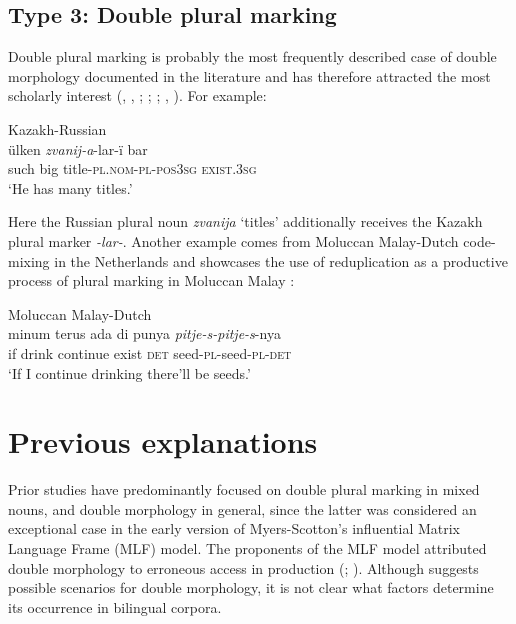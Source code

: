 \subsection{Type 3: Double plural marking}

\noindent Double plural marking is probably the most frequently described case of double morphology documented in the literature and has therefore attracted the most scholarly interest (\citealt[96]{backus-patterns-1992}, \citeyear[151]{backus-two-1996}, \citeyear[98--99]{backus-evidence-1999}; \citealt[90--91]{boumans-syntax-1998}; \citealt[152--156]{muhamedowa-untersuchung-2006}; \citealt[132--135]{myers-scotton-duelling-1993}, \citealt{myers-scotton-matching-1995}). For example:

\ea
\label{ex:6:11}
Kazakh-Russian \citep[152]{muhamedowa-untersuchung-2006}\\
 {ülken} \textit{zvanij-a}-lar-ï {bar}\\
	such big title-\textsc{pl.nom-pl-pos3sg} \textsc{exist.3sg}\\
\glt `He has many titles.'
\z

\noindent Here the Russian plural noun \textit{zvanija} `titles' additionally receives the Kazakh plural marker \textit{-lar-}. Another example comes from Moluccan Malay-Dutch code-mixing in the Netherlands and showcases the use of reduplication as a productive process of plural marking in Moluccan Malay \citep[50--56]{voigt94}:

\ea
\label{ex:6:12}
Moluccan Malay-Dutch \citep[52]{voigt94}\\
 {minum} {terus} {ada} {di punya} \textit{pitje-s-pitje-s}-nya\\
	if drink continue exist \textsc{det} seed-\textsc{pl}-seed-\textsc{pl-det}\\
\glt `If I continue drinking there’ll be seeds.'
\z

\section{Previous explanations}

Prior studies have predominantly focused on double plural marking in mixed nouns, and double morphology in general, since the latter was considered an exceptional case in the early version of Myers-Scotton's \citeyear{myers-scotton-duelling-1993} influential Matrix Language Frame (MLF) model. The proponents of the MLF model attributed double morphology to erroneous access in production (\citealt[132--136]{myers-scotton-duelling-1993}; \citealt[1000]{myers-scotton-matching-1995}). Although \cite[134]{myers-scotton-duelling-1993} suggests possible scenarios for double morphology, it is not clear what factors determine its occurrence in bilingual corpora.

